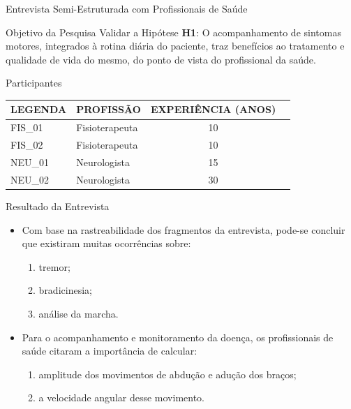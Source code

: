 \documentclass{beamer}
\begin{document}
\begin{frame}{Entrevista Semi-Estruturada com Profissionais de Saúde} 
    \begin{block}{Objetivo da Pesquisa}
      Validar a Hipótese \textbf{H1}: O acompanhamento de sintomas motores, integrados à rotina diária do paciente, traz benefícios ao tratamento e qualidade de vida do mesmo, do ponto de vista do profissional da saúde.
    \end{block}
		\begin{block}{Participantes}
			\begin{table}[h]
			\begin{tabular}{|l|l|c|c|}
			\hline
			\textbf{LEGENDA} & \textbf{PROFISSÃO}             & \multicolumn{1}{|l|}{\textbf{EXPERIÊNCIA (ANOS)}} \\ \hline
			FIS\_01          & Fisioterapeuta & 10                                                \\ \hline
			FIS\_02          & Fisioterapeuta    & 10                                                \\ \hline
			NEU\_01          & Neurologista            & 15                                                \\ \hline
			NEU\_02          & Neurologista            & 30                                                \\ \hline
			\end{tabular}
			\end{table}
    \end{block}
\end{frame} 

\begin{frame}{Resultado da Entrevista} 
    \begin{block}{}
			\begin{itemize}[<+->]
				\item Com base na rastreabilidade dos fragmentos da entrevista, pode-se concluir que existiram muitas ocorrências sobre: 
					\begin{enumerate}
						\item tremor;
						\item bradicinesia;
						\item análise da marcha.
					\end{enumerate}
				\item Para o acompanhamento e monitoramento da doença, os profissionais de saúde citaram a importância de calcular:
					\begin{enumerate}
						\item amplitude dos movimentos de abdução e adução dos braços;
						\item a velocidade angular desse movimento.
					\end{enumerate}
			\end{itemize}
    \end{block}
\end{frame} 
\end{document}
